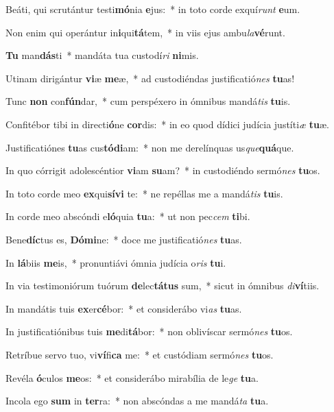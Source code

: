 \item Beáti, qui scrutántur testi\textbf{mó}nia \textbf{e}jus:~* in toto corde exquí\textit{runt} \textbf{e}um.
\item Non enim qui operántur in\textbf{i}qui\textbf{tá}tem,~* in viis ejus ambu\textit{la}\textbf{vé}runt.
\item \textbf{Tu} man\textbf{dás}ti~* mandáta tua custodí\textit{ri} \textbf{ni}mis.
\item Utinam dirigántur \textbf{vi}æ \textbf{me}æ,~* ad custodiéndas justificatió\textit{nes} \textbf{tu}as!
\item Tunc \textbf{non} con\textbf{fún}dar,~* cum perspéxero in ómnibus mandá\textit{tis} \textbf{tu}is.
\item Confitébor tibi in directi\textbf{ó}ne \textbf{cor}dis:~* in eo quod dídici judícia justíti\textit{æ} \textbf{tu}æ.
\item Justificatiónes \textbf{tu}as cus\textbf{tó}\textbf{di}am:~* non me derelínquas us\textit{que}\textbf{quá}que.
\item In quo córrigit adolescéntior \textbf{vi}am \textbf{su}am?~* in custodiéndo sermó\textit{nes} \textbf{tu}os.
\item In toto corde meo \textbf{ex}qui\textbf{sí}\textbf{vi} te:~* ne repéllas me a mandá\textit{tis} \textbf{tu}is.
\item In corde meo abscóndi e\textbf{ló}quia \textbf{tu}a:~* ut non pec\textit{cem} \textbf{ti}bi.
\item Bene\textbf{díc}tus es, \textbf{Dó}\textbf{mi}ne:~* doce me justificatió\textit{nes} \textbf{tu}as.
\item In \textbf{lá}biis \textbf{me}is,~* pronuntiávi ómnia judícia o\textit{ris} \textbf{tu}i.
\item In via testimoniórum tuórum \textbf{de}lec\textbf{tá}\textbf{tus} sum,~* sicut in ómnibus \textit{di}\textbf{ví}tiis.
\item In mandátis tuis \textbf{ex}er\textbf{cé}bor:~* et considerábo vi\textit{as} \textbf{tu}as.
\item In justificatiónibus tuis \textbf{me}di\textbf{tá}bor:~* non oblivíscar sermó\textit{nes} \textbf{tu}os.
\item Retríbue servo tuo, vi\textbf{ví}fi\textbf{ca} me:~* et custódiam sermó\textit{nes} \textbf{tu}os.
\item Revéla \textbf{ó}culos \textbf{me}os:~* et considerábo mirabília de le\textit{ge} \textbf{tu}a.
\item Incola ego \textbf{sum} in \textbf{ter}ra:~* non abscóndas a me mandá\textit{ta} \textbf{tu}a.
